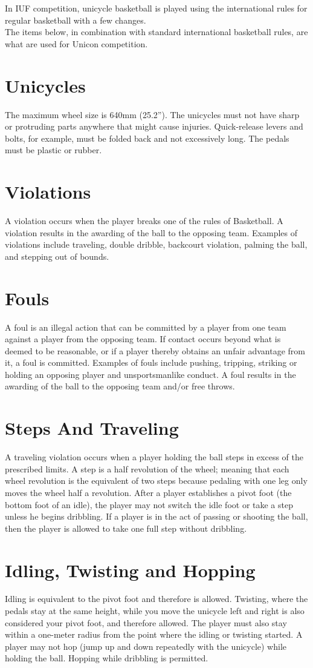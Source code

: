 In IUF competition, unicycle basketball is played using the international rules for regular basketball with a few changes.\\
The items below, in combination with standard international basketball rules, are what are used for Unicon competition.
\section{Unicycles}
The maximum wheel size is 640mm (25.2”). The unicycles must not have sharp or protruding parts anywhere that might
cause injuries. Quick-release levers and bolts, for example, must be folded back and not excessively long. The pedals must
be plastic or rubber.
\section{Violations}
A violation occurs when the player breaks one of the rules of Basketball. A violation results in the awarding of the ball to
the opposing team. Examples of violations include traveling, double dribble, backcourt violation, palming the ball, and
stepping out of bounds.
\section{Fouls}
A foul is an illegal action that can be committed by a player from one team against a player from the opposing team. If
contact occurs beyond what is deemed to be reasonable, or if a player thereby obtains an unfair advantage from it, a foul is
committed. Examples of fouls include pushing, tripping, striking or holding an opposing player and unsportsmanlike
conduct. A foul results in the awarding of the ball to the opposing team and/or free throws.
\section{Steps And Traveling}
A traveling violation occurs when a player holding the ball steps in excess of the prescribed limits. A step is a half
revolution of the wheel; meaning that each wheel revolution is the equivalent of two steps because pedaling with one leg
only moves the wheel half a revolution. After a player establishes a pivot foot (the bottom foot of an idle), the player may
not switch the idle foot or take a step unless he begins dribbling. If a player is in the act of passing or shooting the ball,
then the player is allowed to take one full step without dribbling.
\section{Idling, Twisting and Hopping}
Idling is equivalent to the pivot foot and therefore is allowed. Twisting, where the pedals stay at the same height, while
you move the unicycle left and right is also considered your pivot foot, and therefore allowed. The player must also stay
within a one-meter radius from the point where the idling or twisting started. A player may not hop (jump up and down
repeatedly with the unicycle) while holding the ball. Hopping while dribbling is permitted.
